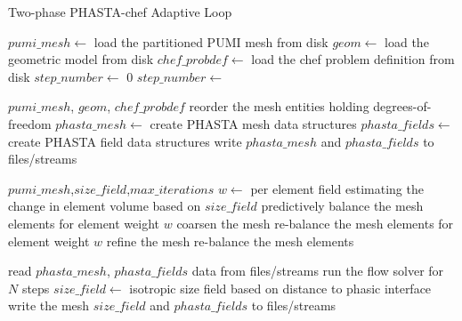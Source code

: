 \begin{algorithm}
  \caption{Two-phase PHASTA-chef Adaptive Loop}\label{alg:twophase}
  \small
  \begin{algorithmic}[1]
      \State $pumi\_mesh \gets$ load the partitioned PUMI mesh
             from disk\label{step:loadmesh}
      \State $geom \gets$ load the geometric model from
             disk\label{step:loadgeom}
      \State $chef\_probdef \gets$ load the chef problem definition
             from disk\label{step:loadprobdef}
      \State {}
             \label{step:preprocess}
      \State $step\_number \gets$ 0
        \State $step\_number \gets$ 
        \State {}
          \label{step:attachPhastaFields}
        \State {}
        \State {}\label{step:phastaParma}
        \State {}
               \label{step:preprocessLoop}
      \EndWhile
    \EndProcedure

              {$pumi\_mesh$, $geom$, $chef\_probdef$}
      \State reorder the mesh entities holding
             degrees-of-freedom \label{step:reorder}
      \State $phasta\_mesh \gets$ create PHASTA mesh data
             structures \label{step:preprocCreateMesh}
      \State $phasta\_fields \gets$ create PHASTA field data
             structures \label{step:preprocCreateFields}
      \State write $phasta\_mesh$ and $phasta\_fields$ to
             files/streams \label{step:preprocWrite}
    \EndProcedure

              {$pumi\_mesh$,$size\_field$,$max\_iterations$}
      \State $w \gets$ per element field estimating
             the change in element volume based on $size\_field$
      \State predictively balance the mesh elements for
             element weight $w$ \label{step:predlb}
         \State coarsen the mesh
         \State re-balance the mesh elements for element
                weight $w$ \label{step:midlb}
         \State refine the mesh
      \EndFor
      \State re-balance the mesh elements
    \EndProcedure

      \State read $phasta\_mesh$, $phasta\_fields$ data from
      files/streams\label{step:loadChefFields}
      \State run the flow solver for $N$ steps\label{step:phastaSolve}
      \State $size\_field \gets$ isotropic size field based on distance to
      phasic interface\label{step:computeSzField}
      \State write the mesh $size\_field$ and $phasta\_fields$ to files/streams
    \EndProcedure
  \end{algorithmic}
\end{algorithm}

